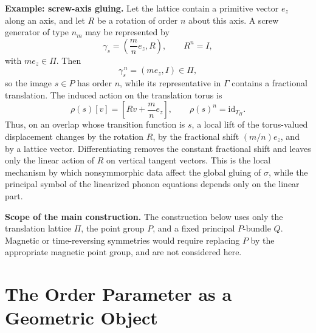 \documentclass[11pt]{amsart}
\theoremstyle{plain}
\theoremstyle{definition}
\theoremstyle{remark}
\begin{document}
\medskip

\noindent\textbf{Example: screw-axis gluing.}
Let the lattice contain a primitive vector \(e_z\) along an axis, and let \(R\) be a rotation of order \(n\) about this axis. 
A screw generator of type \(n_m\) may be represented by
\begin{equation}
	\gamma_s=\left(\frac{m}{n}e_z,R\right),
	\qquad
	R^n=I,
	\label{eq:screw_generator}
\end{equation}
with \(m e_z\in\Pi\). Then
\begin{equation}
	\gamma_s^{\,n}=(m e_z,I)\in\Pi,
	\label{eq:screw_power_translation}
\end{equation}
so the image \(s\in P\) has order \(n\), while its representative in \(\Gamma\) contains a fractional translation. The induced action on the translation torus is
\begin{equation}
	\rho(s)[v]=\left[Rv+\frac{m}{n}e_z\right],
	\qquad
	\rho(s)^n=\mathrm{id}_{T_\Pi}.
	\label{eq:screw_affine_torus_action}
\end{equation}
Thus, on an overlap whose transition function is \(s\), a local lift of the torus-valued displacement changes by the rotation \(R\), by the fractional shift \((m/n)e_z\), and by a lattice vector. 
Differentiating removes the constant fractional shift and leaves only the linear action of \(R\) on vertical tangent vectors. 
This is the local mechanism by which nonsymmorphic data affect the global gluing of \(\sigma\), while the principal symbol of the linearized phonon equations depends only on the linear part.

\medskip

\noindent\textbf{Scope of the main construction.}
The construction below uses only the translation lattice \(\Pi\), the point group \(P\), and a fixed principal \(P\)-bundle \(Q\). 
Magnetic or time-reversing symmetries would require replacing \(P\) by the appropriate magnetic point group, and are not considered here.
\medskip

\section{The Order Parameter as a Geometric Object}
\label{sec:orderparameter}
\end{document}
